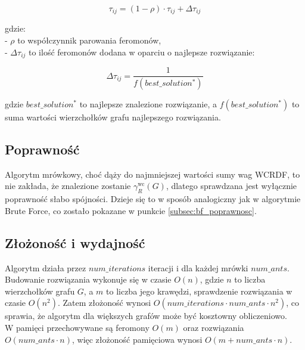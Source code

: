 \[
\tau_{ij} = (1 - \rho) \cdot \tau_{ij} + \Delta \tau_{ij}
\]

gdzie:\\
- \( \rho \) to współczynnik parowania feromonów,\\
- \( \Delta \tau_{ij} \) to ilość feromonów dodana w oparciu o najlepsze rozwiązanie:

\[
\Delta \tau_{ij} = \frac{1}{f(best\_solution^*)}
\]

gdzie \( best\_solution^* \) to najlepsze znalezione rozwiązanie, a \( f(best\_solution^*) \) to suma wartości wierzchołków grafu najlepszego rozwiązania.

\subsection{Poprawność}
Algorytm mrówkowy, choć dąży do najmniejszej wartości sumy wag WCRDF, to nie zakłada, że znalezione zostanie $\gamma^{\text{wc}}_R(G)$, dlatego sprawdzana jest wyłącznie poprawność słabo spójności. Dzieje się to w sposób analogiczny jak w algorytmie Brute Force, co zostało pokazane w punkcie \ref{subsec:bf_poprawnosc}.

\subsection{Złożoność i wydajność}

Algorytm działa przez $num\_iterations$ iteracji i dla każdej mrówki $num\_ants$. Budowanie rozwiązania wykonuje się w czasie $O(n)$, gdzie $n$ to liczba wierzchołków grafu $G$, a $m$ to liczba jego krawędzi, sprawdzenie rozwiązania w czasie $O(n^2)$.
Zatem złożoność wynosi $O(num\_iterations \cdot num\_ants \cdot n^2)$, co sprawia, że algorytm dla większych grafów może być kosztowny obliczeniowo.\\
W pamięci przechowywane są feromony $O(m)$ oraz rozwiązania $O(num\_ants \cdot n)$, więc
złożoność pamięciowa wynosi $O(m+num\_ants \cdot n)$.

